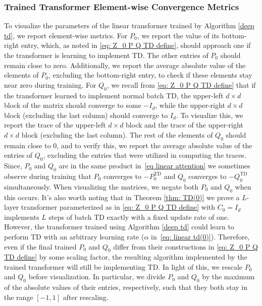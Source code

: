 \documentclass{article}
\newcommand{\td}{\text{TD}}
\begin{document}
\subsubsection{Trained Transformer Element-wise Convergence Metrics} \label{appendix: element-wise metrics}
To visualize the parameters of the linear transformer trained by Algorithm \ref{deep td}, we report element-wise metrics. For $P_0$, we report the value of its bottom-right entry, which, as noted in \eqref{eq: Z_0 P Q TD define}, should approach one if the transformer is learning to implement TD. The other entries of $P_0$ should remain close to zero. Additionally, we report the average absolute value of the elements of $P_0$, excluding the bottom-right entry, to check if these elements stay near zero during training.
For $Q_0$, we recall from \eqref{eq: Z_0 P Q TD define} that if the transformer learned to implement normal batch TD, the upper-left $d\times d$ block of the matrix should converge to some $-I_d$, while the upper-right $d\times d$ block (excluding the last column) should converge to $I_d$. To visualize this, we report the trace of the upper-left $d\times d$ block and the trace of the upper-right $d\times d$ block (excluding the last column). The rest of the elements of $Q_0$ should remain close to 0, and to verify this, we report the average absolute value of the entries of $Q_0$, excluding the entries that were utilized in computing the traces.
Since, $P_0$ and $Q_0$ are in the same product in~\eqref{eq linear attention} we sometimes observe during training that $P_0$ converges to $-P_0^{\td}$ and $Q_0$ converges to $-Q_0^{\td}$ simultaneously. When visualizing the matrices,  we negate both $P_0$ and $Q_0$ when this occurs.
It's also worth noting that in Theorem \ref{thm: TD(0)} we prove a $L$-layer transformer parameterized as in \eqref{eq: Z_0 P Q TD define} with $C_0 = I_d$ implements $L$ steps of batch TD exactly with a fixed update rate of one. However, the transformer trained using Algorithm \ref{deep td} could learn to perform $\td$ with an arbitrary learning rate ($\alpha$ in~\eqref{eq: linear td(0)}). Therefore, even if the final trained $P_0$ and $Q_0$ differ from their constructions in \eqref{eq: Z_0 P Q TD define} by some scaling factor, the resulting algorithm implemented by the trained transformer will still be implementing TD.
In light of this,
we rescale $P_0$ and $Q_0$ before visualization.
In particular, we divide $P_0$ and $Q_0$ by the maximum of the absolute values of their entries, respectively, such that they both stay in the range $[-1, 1]$ after rescaling.
\end{document}
